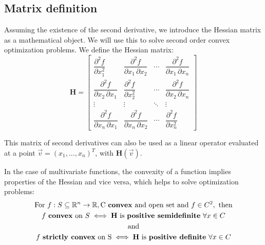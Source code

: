 \documentclass[../convex_optimization.tex]{subfiles}
\begin{document}
\subsection{Matrix definition}
Assuming the existence of the second derivative, we introduce
the Hessian matrix as a mathematical object. We will use this
to solve second order convex optimization problems.
We define the Hessian matrix:
\begin{equation}
    \mathbf H = \begin{bmatrix}
        \dfrac{\partial^2 f}{\partial x_1^2} &
        \dfrac{\partial^2 f}{\partial x_1\,\partial x_2} &
        \cdots & \dfrac{\partial^2 f}{\partial x_1\,\partial x_n} \\[2.2ex]
        \dfrac{\partial^2 f}{\partial x_2\,\partial x_1} &
        \dfrac{\partial^2 f}{\partial x_2^2} & \cdots &
        \dfrac{\partial^2 f}{\partial x_2\,\partial x_n} \\[2.2ex]
        \vdots & \vdots & \ddots & \vdots \\[2.2ex]
        \dfrac{\partial^2 f}{\partial x_n\,\partial x_1} &
        \dfrac{\partial^2 f}{\partial x_n\,\partial x_2} &
        \cdots & \dfrac{\partial^2 f}{\partial x_n^2}
    \end{bmatrix}
    \label{hessian_definition}
\end{equation}

This matrix of second derivatives can also be used as a linear
operator evaluated at a point $\vec{v}=(x_1, \ldots, x_n)^T$,
with $\mathbf H(\vec{v})$.

In the case of multivariate functions, the convexity of a function
implies properties of the Hessian and vice versa, which
helps to solve optimization problems:
\begin{gather}
    \text{For } f: S \subseteq \mathbb R^n \to \mathbb R,
    \text{C \textbf{convex} and open set and } f \in C^2,
    \text{ then}\nonumber\\
    f \text{ \textbf{convex} on }S \iff
    \mathbf H \text{ is \textbf{positive semidefinite} } \forall x \in C\label{hessian_convex}\\
    \text{and}\nonumber\\
    f \text{ \textbf{strictly convex} on S} \iff
    \mathbf H \text{ is \textbf{positive definite} } \forall x \in C
\end{gather}

\newpage
\end{document}
